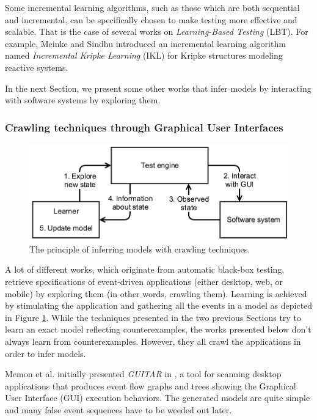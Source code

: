 Some incremental learning algorithms, such as those which are
both sequential and incremental, can be specifically chosen to
make testing more effective and scalable. That is the case of
several works on \textit{Learning-Based Testing} (LBT). For
example, Meinke and Sindhu \cite{tap2011} introduced an
incremental learning algorithm named \textit{Incremental Kripke
Learning} (IKL) for Kripke structures modeling reactive systems.

In the next Section, we present some other works that infer
models by interacting with software systems by exploring them.

\subsubsection{Crawling techniques through Graphical User Interfaces}
\label{sec:active-crawling}

\begin{figure}[ht]
    \begin{center}
        \includegraphics[width=0.9\linewidth]{figures/crawler.png}
    \end{center}

    \caption{The principle of inferring models with crawling
    techniques.}
    \label{fig:crawler}
\end{figure}

A lot of different works, which originate from automatic
black-box testing, retrieve specifications of event-driven
applications (either desktop, web, or mobile) by exploring them
(in other words, crawling them). Learning is achieved by
stimulating the application and gathering all the events in a
model as depicted in Figure \ref{fig:crawler}. While the
techniques presented in the two previous Sections try to learn an
exact model reflecting counterexamples, the works presented below
don't always learn from counterexamples. However, they all crawl
the applications in order to infer models.

Memon et al. initially presented \textit{GUITAR} in
\cite{Memon:2003}, a tool for scanning desktop applications that
produces event flow graphs and trees showing the Graphical User
Interface (GUI) execution behaviors. The generated models are
quite simple and many false event sequences have to be weeded out
later.

